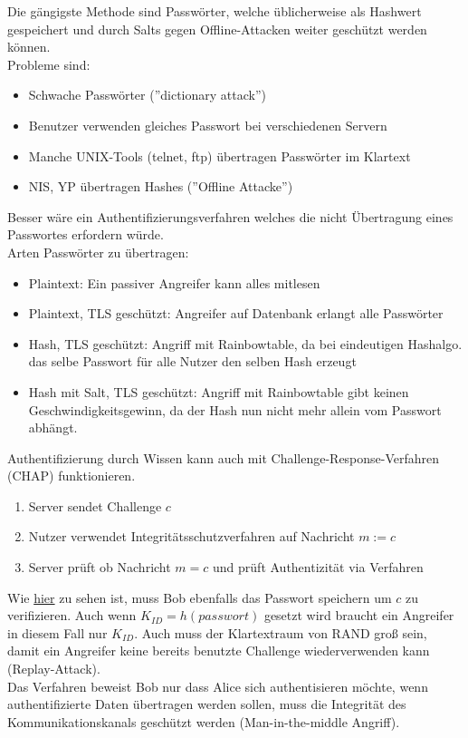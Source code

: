 \documentclass[a4paper,12pt,leqno]{article}
\begin{document}
Die gängigste Methode sind Passwörter, welche üblicherweise als Hashwert gespeichert und durch Salts gegen Offline-Attacken weiter geschützt werden können.\\
Probleme sind:
\begin{itemize}
\item Schwache Passwörter (''dictionary attack'')
\item Benutzer verwenden gleiches Passwort bei verschiedenen Servern
\item Manche UNIX-Tools (telnet, ftp) übertragen Passwörter im Klartext
\item NIS, YP übertragen Hashes (''Offline Attacke'')
\end{itemize}
Besser wäre ein Authentifizierungsverfahren welches die nicht Übertragung eines Passwortes erfordern würde.\\
Arten Passwörter zu übertragen:
\begin{itemize}
\item Plaintext: Ein passiver Angreifer kann alles mitlesen
\item Plaintext, TLS geschützt: Angreifer auf Datenbank erlangt alle Passwörter
\item Hash, TLS geschützt: Angriff mit Rainbowtable, da bei eindeutigen Hashalgo. das selbe Passwort für alle Nutzer den selben Hash erzeugt
\item Hash mit Salt, TLS geschützt: Angriff mit Rainbowtable gibt keinen Geschwindigkeitsgewinn, da der Hash nun nicht mehr allein vom Passwort abhängt.
\end{itemize}
Authentifizierung durch Wissen kann auch mit Challenge-Response-Verfahren (CHAP) funktionieren.
\begin{enumerate}
\item Server sendet Challenge $c$
\item Nutzer verwendet Integritätsschutzverfahren auf Nachricht $m:=c$
\item Server prüft ob Nachricht $m=c$ und prüft Authentizität via Verfahren
\end{enumerate}
Wie \href{figure:CHAP}{hier} zu sehen ist, muss Bob ebenfalls das Passwort speichern um $c$ zu verifizieren. Auch wenn $K_{ID}=h(passwort)$ gesetzt wird braucht ein Angreifer in diesem Fall nur $K_{ID}$. Auch muss der Klartextraum von RAND groß sein, damit ein Angreifer keine bereits benutzte Challenge wiederverwenden kann (Replay-Attack).\\
Das Verfahren beweist Bob nur dass Alice sich authentisieren möchte, wenn authentifizierte Daten übertragen werden sollen, muss die Integrität des Kommunikationskanals geschützt werden (Man-in-the-middle Angriff).
\end{document}
